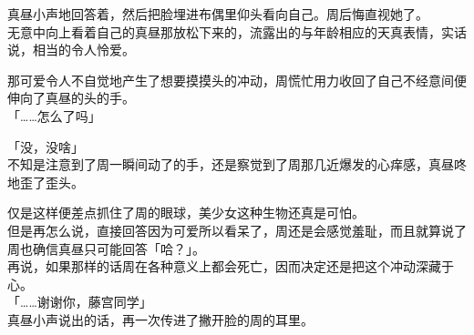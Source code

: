 真昼小声地回答着，然后把脸埋进布偶里仰头看向自己。周后悔直视她了。\\

无意中向上看着自己的真昼那放松下来的，流露出的与年龄相应的天真表情，实话说，相当的令人怜爱。

那可爱令人不自觉地产生了想要摸摸头的冲动，周慌忙用力收回了自己不经意间便伸向了真昼的头的手。\\

「……怎么了吗」

「没，没啥」\\

不知是注意到了周一瞬间动了的手，还是察觉到了周那几近爆发的心痒感，真昼咚地歪了歪头。

仅是这样便差点抓住了周的眼球，美少女这种生物还真是可怕。\\

但是再怎么说，直接回答因为可爱所以看呆了，周还是会感觉羞耻，而且就算说了周也确信真昼只可能回答「哈？」。\\

再说，如果那样的话周在各种意义上都会死亡，因而决定还是把这个冲动深藏于心。\\

「……谢谢你，藤宫同学」\\

真昼小声说出的话，再一次传进了撇开脸的周的耳里。

